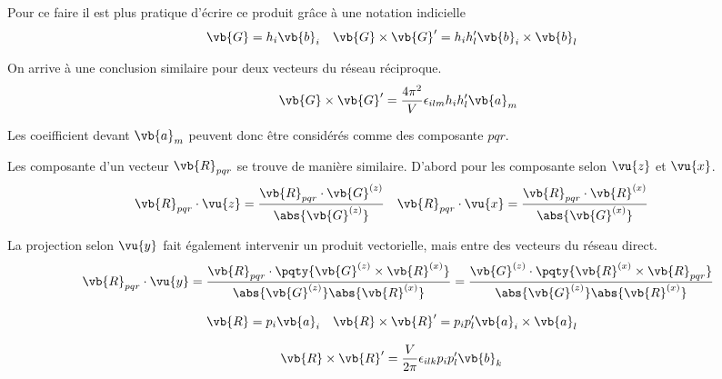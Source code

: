 Pour ce faire il est plus pratique d'écrire ce produit grâce à une notation indicielle
\begin{align*}
	\vb{G} &= h_i \vb{b}_i & \vb{G} \times \vb{G}^\prime &= h_i h_l^\prime \vb{b}_i \times \vb{b}_l
\end{align*}

 On arrive à une conclusion similaire pour deux vecteurs du réseau réciproque.
\begin{align*}
	\vb{G} \times \vb{G}^\prime = \frac{4\pi^2}{V} \epsilon_{ilm}  h_i h_l^\prime  \vb{a}_m
\end{align*}

Les coeifficient devant $\vb{a}_m$ peuvent donc être considérés comme des composante $pqr$.

Les composante d'un vecteur $\vb{R}_{pqr}$ se trouve de manière similaire. D'abord pour les composante selon $\vu{z}$ et $\vu{x}$.
\begin{align*}
	\vb{R}_{pqr} \cdot \vu{z} &= \frac{\vb{R}_{pqr} \cdot \vb{G}^{(z)}}{\abs{\vb{G}^{(z)}}} &
	\vb{R}_{pqr} \cdot \vu{x} &= \frac{\vb{R}_{pqr} \cdot \vb{R}^{(x)}}{\abs{\vb{G}^{(x)}}}
\end{align*}

La projection selon $\vu{y}$ fait également intervenir un produit vectorielle, mais entre des vecteurs du réseau direct.
\begin{align*}
	\vb{R}_{pqr} \cdot \vu{y} = \frac{\vb{R}_{pqr} \cdot \pqty{\vb{G}^{(z)}\times \vb{R}^{(x)}}}{\abs{\vb{G}^{(z)}}\abs{\vb{R}^{(x)}}} = \frac{\vb{G}^{(z)} \cdot \pqty{ \vb{R}^{(x)} \times \vb{R}_{pqr} }}{\abs{\vb{G}^{(z)}}\abs{\vb{R}^{(x)}}}
\end{align*}

\begin{align*}
	\vb{R} &= p_i \vb{a}_i & \vb{R} \times \vb{R}^\prime &= p_i p_l^\prime \vb{a}_i \times \vb{a}_l
\end{align*}

\begin{align*}
	\vb{R} \times \vb{R}^\prime &= \frac{V}{2\pi} \epsilon_{ilk} p_i p_l^\prime \vb{b}_k
\end{align*}

